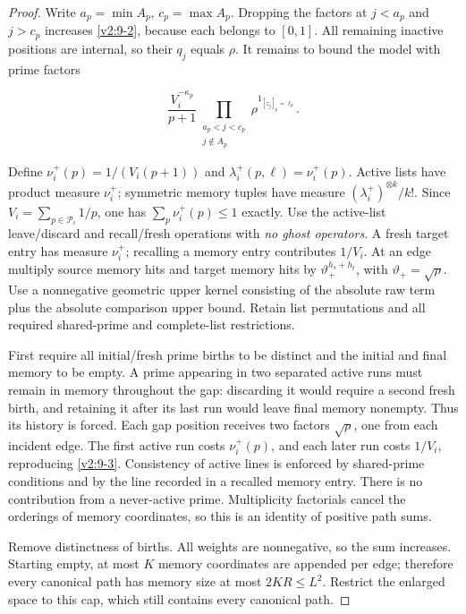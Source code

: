 \documentclass[11pt]{article}
\theoremstyle{definition}
\theoremstyle{remark}
\numberwithin{equation}{section}
\begin{document}
\begin{proof}
Write $a_p=\min A_p$, $c_p=\max A_p$. Dropping the factors at $j<a_p$ and $j>c_p$ increases \eqref{v2:9-2}, because each belongs to $[0,1]$. All remaining inactive positions are internal, so their $q_j$ equals $\rho$. It remains to bound the model with prime factors


\begin{equation}\label{v2:9-3}
\frac{V_i^{-\kappa_p}}{p+1}
\prod_{\substack{a_p<j<c_p\\j\notin A_p}}
\rho^{1_{[z_j]_p=\ell_p}}.
\end{equation}


Define $\nu_i^+(p)=1/(V_i(p+1))$ and $\lambda_i^+(p,\ell)=\nu_i^+(p)$. Active lists have product measure $\nu_i^+$; symmetric memory tuples have measure $(\lambda_i^+)^{\otimes k}/k!$. Since $V_i=\sum_{p\in\mathcal P_i}1/p$, one has $\sum_p\nu_i^+(p)\le1$ exactly. Use the active-list leave/discard and recall/fresh operations with \emph{no ghost operators}. A fresh target entry has measure $\nu_i^+$; recalling a memory entry contributes $1/V_i$. At an edge multiply source memory hits and target memory hits by $\vartheta_+^{h_s+h_t}$, with $\vartheta_+=\sqrt\rho$. Use a nonnegative geometric upper kernel consisting of the absolute raw term plus the absolute comparison upper bound. Retain list permutations and all required shared-prime and complete-list restrictions.

First require all initial/fresh prime births to be distinct and the initial and final memory to be empty. A prime appearing in two separated active runs must remain in memory throughout the gap: discarding it would require a second fresh birth, and retaining it after its last run would leave final memory nonempty. Thus its history is forced. Each gap position receives two factors $\sqrt\rho$, one from each incident edge. The first active run costs $\nu_i^+(p)$, and each later run costs $1/V_i$, reproducing \eqref{v2:9-3}. Consistency of active lines is enforced by shared-prime conditions and by the line recorded in a recalled memory entry. There is no contribution from a never-active prime. Multiplicity factorials cancel the orderings of memory coordinates, so this is an identity of positive path sums.

Remove distinctness of births. All weights are nonnegative, so the sum increases. Starting empty, at most $K$ memory coordinates are appended per edge; therefore every canonical path has memory size at most $2KR\le L^2$. Restrict the enlarged space to this cap, which still contains every canonical path.


\end{proof}
\end{document}
